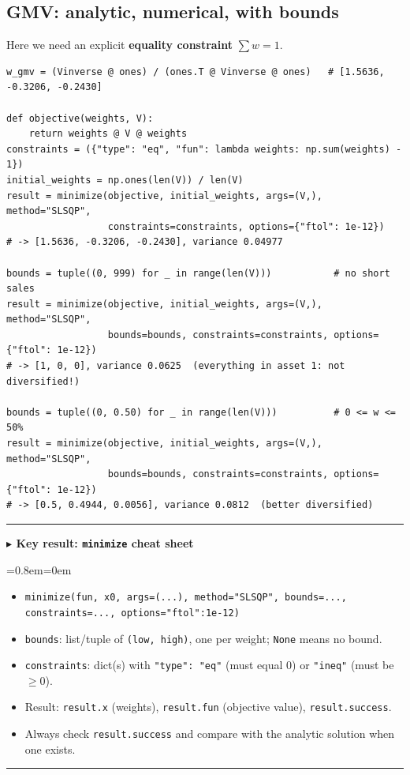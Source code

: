 \documentclass[11pt,a4paper]{report}
\newenvironment{notebox}[1]
  {\par\medskip\Needspace{6\baselineskip}\noindent\rule{\linewidth}{0.4pt}\par\nopagebreak
   \noindent\textbf{#1}\par\nopagebreak
   \begin{list}{}{\leftmargin=0.8em\rightmargin=0em\topsep=2pt}\item[]}
  {\end{list}\nopagebreak\noindent\rule{\linewidth}{0.4pt}\par\medskip}
\newenvironment{keybox}[1][]{\begin{notebox}{$\blacktriangleright$ Key result#1}}{\end{notebox}}
\begin{document}
\subsection{GMV: analytic, numerical, with bounds}
Here we need an explicit \textbf{equality constraint} $\sum w=1$.
\begin{lstlisting}
w_gmv = (Vinverse @ ones) / (ones.T @ Vinverse @ ones)   # [1.5636, -0.3206, -0.2430]

def objective(weights, V):
    return weights @ V @ weights
constraints = ({"type": "eq", "fun": lambda weights: np.sum(weights) - 1})
initial_weights = np.ones(len(V)) / len(V)
result = minimize(objective, initial_weights, args=(V,), method="SLSQP",
                  constraints=constraints, options={"ftol": 1e-12})
# -> [1.5636, -0.3206, -0.2430], variance 0.04977

bounds = tuple((0, 999) for _ in range(len(V)))           # no short sales
result = minimize(objective, initial_weights, args=(V,), method="SLSQP",
                  bounds=bounds, constraints=constraints, options={"ftol": 1e-12})
# -> [1, 0, 0], variance 0.0625  (everything in asset 1: not diversified!)

bounds = tuple((0, 0.50) for _ in range(len(V)))          # 0 <= w <= 50%
result = minimize(objective, initial_weights, args=(V,), method="SLSQP",
                  bounds=bounds, constraints=constraints, options={"ftol": 1e-12})
# -> [0.5, 0.4944, 0.0056], variance 0.0812  (better diversified)
\end{lstlisting}
\begin{keybox}[: \texttt{minimize} cheat sheet]
\begin{itemize}
  \item \texttt{minimize(fun, x0, args=(...), method="SLSQP", bounds=..., constraints=..., options={"ftol":1e-12})}
  \item \texttt{bounds}: list/tuple of \texttt{(low, high)}, one per weight; \texttt{None} means no bound.
  \item \texttt{constraints}: dict(s) with \texttt{"type": "eq"} (must equal 0) or \texttt{"ineq"} (must be $\ge0$).
  \item Result: \texttt{result.x} (weights), \texttt{result.fun} (objective value), \texttt{result.success}.
  \item Always check \texttt{result.success} and compare with the analytic solution when one exists.
\end{itemize}
\end{keybox}
\end{document}
